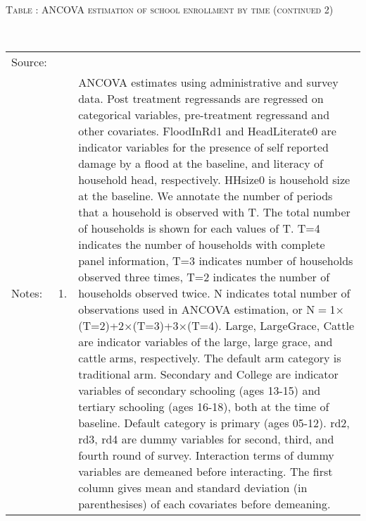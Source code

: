 \begin{minipage}[t]{14cm}
\setlength{\tabcolsep}{1pt} \begin{tabular}{>{\hfill\scriptsize}p{1cm}<{}>{\hfill\scriptsize}p{.25cm}<{}>{\scriptsize}p{12cm}<{\hfill}}   \end{tabular}
\end{minipage} \\\\\addtocounter{table}{-1}\hspace{-1cm}\begin{minipage}[t]{14cm} \hfil\textsc{\normalsize Table \thetable: ANCOVA estimation of school enrollment by time (continued 2)\label{tab ANCOVA enroll time varying3}}\\ \setlength{\tabcolsep}{1pt}
  \setlength{\baselineskip}{8pt}
  \renewcommand{\arraystretch}{.55}
  \hfil{}\\
\renewcommand{\arraystretch}{.8}
\setlength{\tabcolsep}{1pt} \begin{tabular}{>{\hfill\scriptsize}p{1cm}<{}>{\hfill\scriptsize}p{.25cm}<{}>{\scriptsize}p{12cm}<{\hfill}} 
Source:& \multicolumn{2}{l}{\scriptsize Estimated with GUK administrative and survey data.}\\
Notes: & 1. & ANCOVA estimates using administrative and survey data. Post treatment regressands are regressed on categorical variables, pre-treatment regressand and other covariates. \textsf{FloodInRd1} and \textsf{HeadLiterate0} are indicator variables for the presence of self reported damage by a flood at the baseline, and literacy of household head, respectively. \textsf{HHsize0} is household size at the baseline. We annotate the number of periods that a household is observed with \textsf{T}. The total number of households is shown for each values of \textsf{T}. \textsf{T=4} indicates the number of households with complete panel information, \textsf{T=3} indicates number of households observed three times, \textsf{T=2} indicates the number of households observed twice. \textsf{N} indicates total number of observations used in ANCOVA estimation, or \textsf{N$=$1$\times$(T=2)+2$\times$(T=3)+3$\times$(T=4)}.  \textsf{Large}, \textsf{LargeGrace}, \textsf{Cattle} are indicator variables of the \textsf{large}, \textsf{large grace}, and \textsf{cattle} arms, respectively. The default arm category is \textsf{traditional} arm. \textsf{Secondary} and \textsf{College} are indicator variables of secondary schooling (ages 13-15) and tertiary schooling (ages 16-18), both at the time of baseline. Default category is primary (ages 05-12). \textsf{rd2, rd3, rd4} are dummy variables for second, third, and fourth round of survey. Interaction terms of dummy variables are demeaned before interacting. The first column gives mean and standard deviation (in parenthesises) of each covariates before demeaning. \\

\end{tabular}
\end{minipage}
